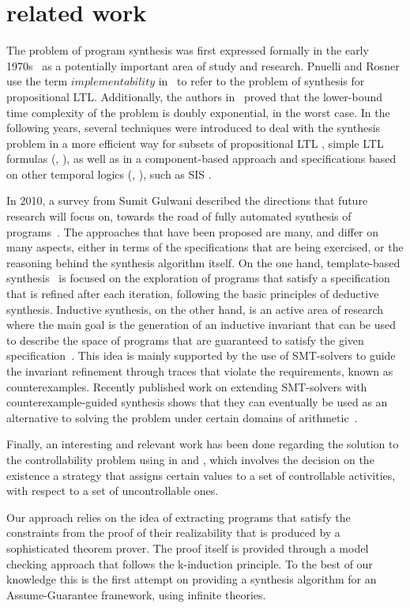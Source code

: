 \section{related work}
\label{sec:related work}

The problem of program synthesis was first expressed formally in the early
1970s~\cite{manna1971toward} as a potentially important area of study and
research. 
Pnuelli and Rosner use the term
$\textit{implementability}$ in~\cite{Pnueli89} to refer to the problem of synthesis for
propositional LTL. Additionally, the authors in~\cite{Pnueli89} proved that the
lower-bound time complexity of the problem is doubly exponential, in the worst
case. In the following years, several techniques were introduced to deal with
the synthesis problem in a more efficient way for subsets of propositional LTL
\cite{Klein10}, simple LTL formulas (\cite{Bohy12}, \cite{Tini03}), as well as
in a component-based approach \cite{Chatterjee07} and specifications based on
other temporal logics (\cite{benevs2012factorization}, \cite{Hamza10}), such as SIS
\cite{Aziz95}.

In 2010, a survey from Sumit Gulwani described the 
directions that future research will focus on, towards the
road of fully automated synthesis of programs~\cite{gulwani2010dimensions}.
%
The approaches that have been proposed are many, and differ on many aspects,
either in terms of the specifications that are being exercised, or the reasoning
behind the synthesis algorithm itself. On the one hand, template-based
synthesis~\cite{srivastava2013template} is focused on the exploration of
programs that satisfy a specification that is refined after each
iteration, following the basic principles of deductive synthesis. Inductive
synthesis, on the other hand, is an active area of research where the main goal
is the generation of an inductive invariant that can be used to describe the
space of programs that are guaranteed to satisfy the given
specification~\cite{flener2001inductive}.
This idea is mainly supported by the use of SMT-solvers to guide the invariant
refinement through traces that violate the requirements, known as
counterexamples. Recently published work on extending SMT-solvers with
counterexample-guided synthesis shows that they can eventually be
used as an alternative to solving the problem under certain domains of
arithmetic~\cite{reynoldscounterexample}.

Finally, an interesting and relevant work has been done regarding the solution
to the controllability problem using in \cite{micheli_aaai_2012}
\cite{micheli_cp_2012} and \cite{micheli_constraints_2014}, which involves the
decision on the existence a strategy that assigns certain values to a set of
controllable activities, with respect to a set of uncontrollable ones.

Our approach relies on the idea of extracting programs that satisfy the
constraints from the proof of their realizability that is produced by a
sophisticated theorem prover. The proof itself is provided
through a model checking approach that follows the k-induction principle. To the
best of our knowledge this is the first attempt on providing a synthesis
algorithm for an Assume-Guarantee framework, using infinite theories.
